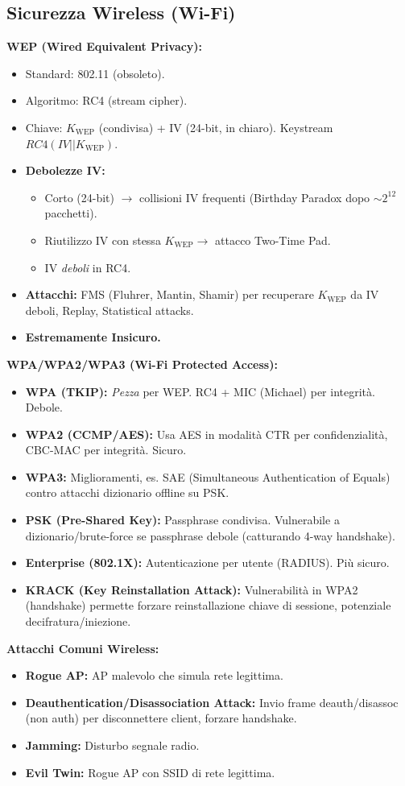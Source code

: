 \documentclass[10pt,a4paper]{article}
\begin{document}
\begin{multicols}{2}
\section*{Sicurezza Wireless (Wi-Fi)}
\textbf{WEP (Wired Equivalent Privacy):}
\begin{itemize}
    \item Standard: 802.11 (obsoleto).
    \item Algoritmo: RC4 (stream cipher).
    \item Chiave: $K_{\text{WEP}}$ (condivisa) + IV (24-bit, in chiaro). Keystream $RC4(IV || K_{\text{WEP}})$.
    \item \textbf{Debolezze IV:}
    \begin{itemize}
        \item Corto (24-bit) $\rightarrow$ collisioni IV frequenti (Birthday Paradox dopo $\sim 2^{12}$ pacchetti).
        \item Riutilizzo IV con stessa $K_{\text{WEP}} \rightarrow$ attacco Two-Time Pad.
        \item IV \textit{deboli} in RC4.
    \end{itemize}
    \item \textbf{Attacchi:} FMS (Fluhrer, Mantin, Shamir) per recuperare $K_{\text{WEP}}$ da IV deboli, Replay, Statistical attacks.
    \item \textbf{Estremamente Insicuro.}
\end{itemize}
\textbf{WPA/WPA2/WPA3 (Wi-Fi Protected Access):}
\begin{itemize}
    \item \textbf{WPA (TKIP):} \textit{Pezza} per WEP. RC4 + MIC (Michael) per integrità. Debole.
    \item \textbf{WPA2 (CCMP/AES):} Usa AES in modalità CTR per confidenzialità, CBC-MAC per integrità. Sicuro.
    \item \textbf{WPA3:} Miglioramenti, es. SAE (Simultaneous Authentication of Equals) contro attacchi dizionario offline su PSK.
    \item \textbf{PSK (Pre-Shared Key):} Passphrase condivisa. Vulnerabile a dizionario/brute-force se passphrase debole (catturando 4-way handshake).
    \item \textbf{Enterprise (802.1X):} Autenticazione per utente (RADIUS). Più sicuro.
    \item \textbf{KRACK (Key Reinstallation Attack):} Vulnerabilità in WPA2 (handshake) permette forzare reinstallazione chiave di sessione, potenziale decifratura/iniezione.
\end{itemize}
\textbf{Attacchi Comuni Wireless:}
\begin{itemize}
    \item \textbf{Rogue AP:} AP malevolo che simula rete legittima.
    \item \textbf{Deauthentication/Disassociation Attack:} Invio frame deauth/disassoc (non auth) per disconnettere client, forzare handshake.
    \item \textbf{Jamming:} Disturbo segnale radio.
    \item \textbf{Evil Twin:} Rogue AP con SSID di rete legittima.
\end{itemize}


\end{multicols}
\end{document}
